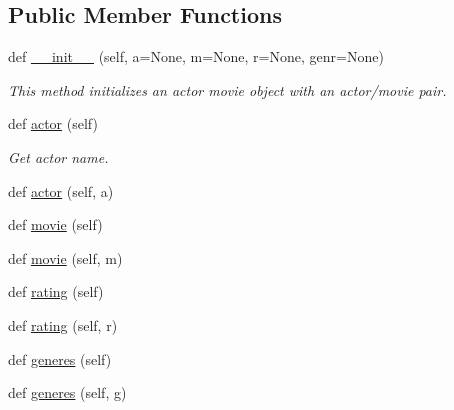 \subsection*{Public Member Functions}
\begin{DoxyCompactItemize}
\item 
def \mbox{\hyperlink{classbridges_1_1data__src__dependent_1_1actor__movie__imdb_1_1_actor_movie_i_m_d_b_add733f3ecfc9282d102cee6bf5e20674}{\+\_\+\+\_\+init\+\_\+\+\_\+}} (self, a=None, m=None, r=None, genr=None)
\begin{DoxyCompactList}\small\item\em This method initializes an actor movie object with an actor/movie pair. \end{DoxyCompactList}\item 
def \mbox{\hyperlink{classbridges_1_1data__src__dependent_1_1actor__movie__imdb_1_1_actor_movie_i_m_d_b_aff9f7941225e72653d26171a596c6ef7}{actor}} (self)
\begin{DoxyCompactList}\small\item\em Get actor name. \end{DoxyCompactList}\item 
def \mbox{\hyperlink{classbridges_1_1data__src__dependent_1_1actor__movie__imdb_1_1_actor_movie_i_m_d_b_a030a7f94d4cfc3a105f4e0218a382276}{actor}} (self, a)
\item 
def \mbox{\hyperlink{classbridges_1_1data__src__dependent_1_1actor__movie__imdb_1_1_actor_movie_i_m_d_b_a05c035927b682e537b0931a1951ac579}{movie}} (self)
\item 
def \mbox{\hyperlink{classbridges_1_1data__src__dependent_1_1actor__movie__imdb_1_1_actor_movie_i_m_d_b_acf1fb5f37a8fa19ee503b031a20638d5}{movie}} (self, m)
\item 
def \mbox{\hyperlink{classbridges_1_1data__src__dependent_1_1actor__movie__imdb_1_1_actor_movie_i_m_d_b_a38ab0b7ab41a2c2c31111264de3952cb}{rating}} (self)
\item 
def \mbox{\hyperlink{classbridges_1_1data__src__dependent_1_1actor__movie__imdb_1_1_actor_movie_i_m_d_b_a72585e9e7ad9d2d2409cbd4f6fb92fcc}{rating}} (self, r)
\item 
def \mbox{\hyperlink{classbridges_1_1data__src__dependent_1_1actor__movie__imdb_1_1_actor_movie_i_m_d_b_a4fcdcdeb2812b905c1e4f260833ddbf0}{generes}} (self)
\item 
def \mbox{\hyperlink{classbridges_1_1data__src__dependent_1_1actor__movie__imdb_1_1_actor_movie_i_m_d_b_acd36a6c77775745c7a5b56f33fa3e6f4}{generes}} (self, g)
\end{DoxyCompactItemize}


